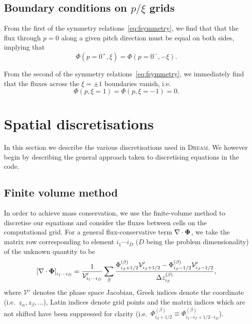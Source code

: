 \documentclass{notes}
\newcommand{\DREAM}{\textsc{Dream}}
\newcommand{\Vp}{\mathcal{V}'}
\begin{document}
    \subsection{Boundary conditions on $p/\xi$ grids}
    From the first of the symmetry relations~\eqref{eq:fsymmetry}, we find that
    that the flux through $p=0$ along a given pitch direction must be equal on
    both sides, implying that
    \begin{equation}
        \Phi\left(p=0^+, \xi\right) = \Phi\left(p=0^-, -\xi\right).
    \end{equation}

    From the second of the symmetry relations~\eqref{eq:fsymmetry}, we
    immediately find that the fluxes across the $\xi=\pm1$ boundaries vanish,
    i.e.\
    \begin{equation}\label{eq:bc:xiInternal}
        \Phi(p, \xi=1) = \Phi(p, \xi=-1) = 0.
    \end{equation}

    \section{Spatial discretisations}
    In this section we describe the various discretisations used in \DREAM. We
    however begin by describing the general approach taken to discretising
    equations in the code.

    \subsection{Finite volume method}
    In order to achieve mass conservation, we use the finite-volume method to
    discretise our equations and consider the fluxes between cells on the
    computational grid. For a general flux-conservative term
    $\nabla\cdot\boldsymbol{\Phi}$, we take the matrix row corresponding to element
    $i_1\cdots i_D$ ($D$ being the problem dimensionality) of the unknown
    quantity to be
    \begin{equation}
        \left[ \nabla\cdot\bb{\Phi} \right]_{i_1\cdots i_D}  =
            \frac{1}{\Vp_{i_1\cdots i_D}}\sum_\beta \frac{
                \Phi^{(\beta)}_{i_\beta+1/2} \Vp_{i_\beta+1/2} -
                \Phi^{(\beta)}_{i_\beta-1/2} \Vp_{i_\beta-1/2}
            }{\Delta z^{(\beta)}_{i_\beta}},
    \end{equation}
    where $\Vp$ denotes the phase space Jacobian, Greek indices denote the
    coordinate (i.e.\ $z_\alpha, z_\beta, \ldots$), Latin indices denote grid
    points and the matrix indices which are not shifted have been suppressed for
    clarity (i.e.\
    $\Phi^{(\beta)}_{i_\beta+1/2}\equiv\Phi^{(\beta)}_{i_1\cdots i_\beta+1/2\cdots i_D}$).
\end{document}
